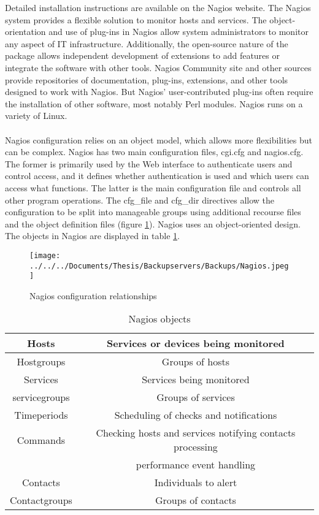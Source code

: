 \documentclass[english]{tktltiki2}
\theoremstyle{definition}
\theoremstyle{remark}
\begin{document}
Detailed installation instructions are available on the Nagios website.
The Nagios system provides a flexible solution to monitor hosts and services. The object-orientation and use of plug-ins in Nagios allow system administrators to monitor any aspect of IT infrastructure. 
Additionally, the open-source nature of the package allows independent development of extensions to add features or integrate the software with other tools. Nagios Community site and other sources provide repositories of documentation, plug-ins, extensions, and other tools designed to work with Nagios. But Nagios' user-contributed plug-ins often require the installation of other software, most notably Perl modules. Nagios runs on a variety of Linux. \\ \\
Nagios configuration relies on an object model, which allows more flexibilities but can be complex. 
Nagios has two main configuration files, cgi.cfg and nagios.cfg. The former is primarily used by the Web interface to authenticate users and control access, and it defines whether authentication is used and which users can access what functions. The latter is the main configuration file and controls all other program operations. The cfg\_file and cfg\_dir directives allow the configuration to be split into manageable groups using additional recourse files and the object definition files (figure \ref{fig:Nagios}). 
Nagios uses an object-oriented design. The objects in Nagios are displayed in table \ref{table:1}. 



\begin{figure}[h!]
\texttt{[image: ../../../Documents/Thesis/Backupservers/Backups/Nagios.jpeg]} 
\caption{Nagios configuration relationships}
\label{fig:Nagios} 
\end{figure}
\pagebreak
\begin{table}[h]
\begin{center}
\begin{tabular}{ |c|c| } 
 \hline
 Hosts & Services or devices being monitored \\
 \hline
 Hostgroups & Groups of hosts\\ 
 \hline
 Services   & Services being monitored\\
 \hline
 servicegroups & Groups of services\\
 \hline
 Timeperiods   & Scheduling of checks and notifications\\
 \hline
 Commands & Checking hosts and services notifying contacts processing\\			  & performance event handling\\
 \hline
 Contacts & Individuals to alert  \\ 
 \hline
 Contactgroups & Groups of contacts\\
 \hline
\end{tabular}
\end{center}
\caption{Nagios objects}
\label{table:1}
\end{table}
\end{document}
